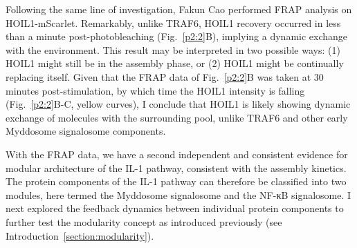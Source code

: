Following the same line of investigation, Fakun Cao performed FRAP analysis on HOIL1-mScarlet. Remarkably, unlike TRAF6, HOIL1 recovery occurred in less than a minute post-photobleaching (Fig.~\ref{p2:2}B), implying a dynamic exchange with the environment. This result may be interpreted in two possible ways: (1) HOIL1 might still be in the assembly phase, or (2) HOIL1 might be continually replacing itself. Given that the FRAP data of Fig.~\ref{p2:2}B was taken at 30 minutes post-stimulation, by which time the HOIL1 intensity is falling (Fig.~\ref{p2:2}B-C, yellow curves), I conclude that HOIL1 is likely showing dynamic exchange of molecules with the surrounding pool, unlike TRAF6 and other early Myddosome signalosome components.

With the FRAP data, we have a second independent and consistent evidence for modular architecture of the IL-1 pathway, consistent with the assembly kinetics. The protein components of the IL-1 pathway can therefore be classified into two modules, here termed the Myddosome signalosome and the NF-κB signalosome. I next explored the feedback dynamics between individual protein components to further test the modularity concept as introduced previously (see Introduction~\ref{section:modularity}).


